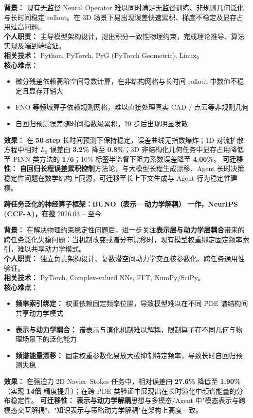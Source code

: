 \documentclass[11pt]{article}
\newlength{\interProjectSpacing}
\newcommand{\projectsep}{\vspace{\interProjectSpacing}}
\begin{document}
\textbf{背景：} 现有无监督 Neural Operator 难以同时满足无监督训练、非规则几何泛化与长时间稳定 rollout。在 3D 场景下易出现误差快速累积、梯度不稳定及显存占用过高问题。\\
\textbf{个人职责：} 主导模型架构设计，提出积分一致性物理约束，完成理论推导、算法实现及端到端验证。\\
\textbf{相关技术：} Python, PyTorch, PyG (PyTorch Geometric), Linux。\\
\textbf{核心难点：}
    \begin{itemize}[leftmargin=1.6em]
        \item 微分残差依赖高阶空间导数计算，在非结构网格与长时间 rollout 中数值不稳定且显存开销大  
        \item FNO 等频域算子依赖规则网格，难以直接处理真实 CAD / 点云等非规则几何  
        \item 自回归预测误差随时间指数级累积，20 步后出现明显发散
    \end{itemize}
\textbf{效果：} 在 \textbf{50-step} 长时间预测下保持稳定，误差曲线无指数爆炸；1D 对流扩散方程中相对 $L_2$ 误差由 \textbf{3.2\%} 降至 \textbf{0.8\%}；3D 非结构化几何任务中显存占用降低至 PINN 类方法的 \textbf{1/6}；10\% 标签半监督下阻力系数误差降至 \textbf{4.06\%}。
\textbf{可迁移性：} \textbf{自回归长程误差累积控制}方法论，与大模型长程生成漂移、Agent 长时决策稳定性问题在数学结构上同源，可迁移至长上下文生成与 Agent 行为稳定性建模。

\projectsep

\textbf{跨任务泛化的神经算子框架：BUNO（表示—动力学解耦）} 
\textcolor{CVBlue}{\textbf{一作，NeurIPS (CCF-A)，在投}}
\hfill 2026.03 -- 至今


\textbf{背景：} 在解决物理约束稳定性问题后，进一步关注\textbf{表示层与动力学层耦合}带来的跨任务泛化失稳问题：当机制改变或谱分布漂移时，现有模型权重绑定固定频率索引，难以共享动力学模式。\\
\textbf{个人职责：} 独立负责架构设计、复数潜空间动力学交互核参数化、跨任务通用性验证。\\
\textbf{相关技术：} PyTorch, Complex-valued NNs, FFT, NumPy/SciPy。\\
\textbf{核心难点：}
    \begin{itemize}[leftmargin=1.6em]
        \item \textbf{频率索引绑定：} 权重依赖固定频率位置，导致模型难以在不同 PDE 谱结构间共享动力学模式
        \item \textbf{表示与动力学耦合：} 谱表示与演化机制难以解耦，限制算子在不同几何与物理场景下的泛化能力
        \item \textbf{频谱能量漂移：} 固定权重参数化易放大或抑制特定频率，导致长时自回归预测失稳
    \end{itemize}
\textbf{效果：} 在强迫力 2D Navier–Stokes 任务中，相对误差由 \textbf{27.6\%} 降低至 \textbf{1.90\%}（实现 \textbf{14倍} 精度提升）；在跨 PDE 类验证中展现出在长时演化中频谱能量的分布稳定性。
\textbf{可迁移性：} \textbf{表示与动力学解耦}思想与多模态/Agent 中"模态表示与跨模态交互解耦"、"知识表示与策略动力学解耦"在架构上高度一致。
\end{document}
